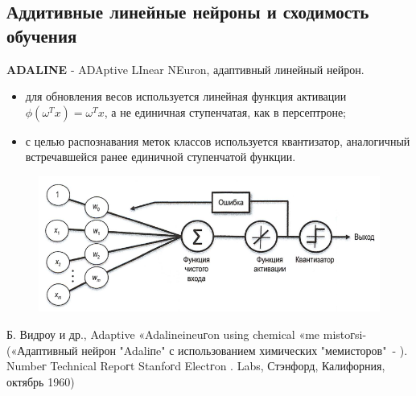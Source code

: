\documentclass{beamer}
\begin{document}
\subsection{Аддитивные линейные нейроны и сходимость обучения}

\begin{frame}[t]
\textbf{ADALINE} - ADAptive LInear NEuron, адаптивный линейный нейрон.
\begin{itemize}
\item для обновления весов используется линейная функция активации $\phi(\omega^T x) = \omega^Tx$,
а не единичная ступенчатая, как в персептроне;
\item с целью распознавания меток классов используется квантизатор, аналогичный встречавшейся ранее единичной ступенчатой функции.
\end{itemize}
\begin{figure}[h]
\centering
\includegraphics[scale=0.4]{images/lec03-pic19.png}
\end{figure}
Б. Видроу и др., Adaptive «Adalineineuгon using chemical «me mistoгsi- («Адаптивный нейрон "Adaliпe" с использованием химических "мемисторов"~- ). Numbeг Technical Repoгt Stanfoгd Electгon . Labs, Стэнфорд, Калифорния, октябрь 1960)
\end{frame}
\end{document}
